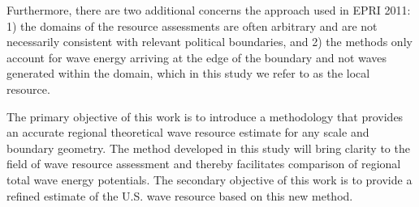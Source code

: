 Furthermore, there are two additional concerns \DIFdelbegin {}\DIFdelend \DIFaddbegin {}\DIFaddend the approach used in EPRI 2011\DIFdelbegin {}\DIFdelend : 1) the domains of the resource assessments are often arbitrary and are not necessarily consistent with relevant political boundaries, and 2) the methods only account for wave energy arriving at the edge of the boundary and not \DIFdelbegin {}\DIFdelend waves generated within the domain, which in this study we refer to as the local resource.
\DIFdelbegin {}\DIFdelend 

The primary objective of this work is to introduce a methodology that provides an accurate regional theoretical wave resource estimate for any scale and boundary geometry. The method developed in this study will bring clarity to the field of wave resource assessment and thereby facilitates comparison of regional total wave energy potentials. The secondary objective of this work is to provide a refined estimate of the U.S. wave resource based on this new method\DIFdelbegin {}\DIFdelend .
